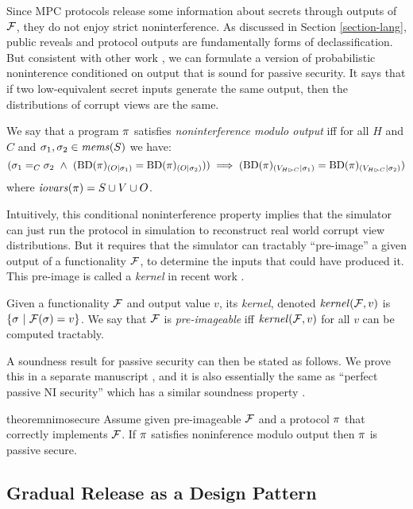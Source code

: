 Since MPC protocols release some information about secrets through
outputs of $\mathcal{F}$, they do not enjoy strict noninterference.  As
discussed in Section \ref{section-lang}, public reveals and protocol
outputs are fundamentally forms of declassification.  But consistent
with other work \cite{8429300}, we can formulate a version of
probabilistic noninterence conditioned on output that is sound
for passive security. It says that if two low-equivalent secret
inputs generate the same output, then the distributions of corrupt
views are the same. 
\begin{definition}
  \label{definition-NIMO}
  We say that a program $\pi$ satisfies \emph{noninterference modulo output}
  iff for all $H$ and $C$ and 
  $\sigma_1,\sigma_2 \in \mathit{mems}(S)$ we have:
  $$
  (\store_1 =_C \store_2 \ \wedge \ 
  (\condd{\progtt(\prog)}{O}{\store_1} = \condd{\progtt(\prog)}{O}{\store_2}))
  \implies 
  (\condd{\progtt(\prog)}{\houtputs}{\store_1} = \condd{\progtt(\prog)}{\houtputs}{\store_2})
  $$
  where $\mathit{iovars}(\pi) = S \cup V \cup O$.
\end{definition}
Intuitively, this conditional noninterference property implies that
the simulator can just run the protocol in simulation to
reconstruct real world corrupt view distributions. But it requires
that the simulator can tractably ``pre-image'' a given output of
a functionality $\mathcal{F}$, to determine the inputs that
could have produced it. This pre-image is called a
\emph{kernel} in recent work \cite{XXX}.
\begin{definition}
  Given a functionality $\mathcal{F}$ and output value $v$, its
  \emph{kernel}, denoted $\mathit{kernel}(\mathcal{F},v)$ is
  $
  \{ \sigma\ |\ \mathcal{F}(\sigma) = v \}
  $.
  We say that $\mathcal{F}$ is \emph{pre-imageable} iff $\mathit{kernel}(\mathcal{F}, v)$ for all
  $v$ can be computed tractably.
\end{definition}
A soundness result for passive security can then be stated as follows.
We prove this in a separate manuscript \cite{XXX}, and it is also
essentially the same as ``perfect passive NI security'' which
has a similar soundness property \cite{8429300}.  
\begin{restatable}{theorem}{nimosecure}
  \label{theorem-nimo}
  Assume given pre-imageable $\mathcal{F}$ and a protocol $\pi$ that
  correctly implements $\mathcal{F}$.  If $\pi$ satisfies noninference modulo output
  then $\pi$ is passive secure.
\end{restatable}

\subsection{Gradual Release as a Design Pattern}

